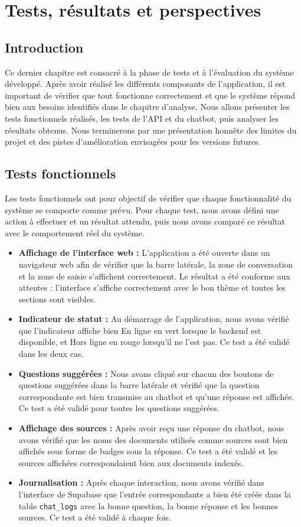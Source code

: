 \documentclass[12pt, a4paper, twoside]{report}
\begin{document}
\chapter{Tests, résultats et perspectives}

\section{Introduction}
Ce dernier chapitre est consacré à la phase de tests et à l'évaluation du système développé. Après avoir réalisé les différents composants de l'application, il est important de vérifier que tout fonctionne correctement et que le système répond bien aux besoins identifiés dans le chapitre d'analyse. Nous allons présenter les tests fonctionnels réalisés, les tests de l'API et du chatbot, puis analyser les résultats obtenus. Nous terminerons par une présentation honnête des limites du projet et des pistes d'amélioration envisagées pour les versions futures.

\section{Tests fonctionnels}
Les tests fonctionnels ont pour objectif de vérifier que chaque fonctionnalité du système se comporte comme prévu. Pour chaque test, nous avons défini une action à effectuer et un résultat attendu, puis nous avons comparé ce résultat avec le comportement réel du système.

\begin{itemize}[label=\bullet]
    \item \textbf{Affichage de l'interface web :} L'application a été ouverte dans un navigateur web afin de vérifier que la barre latérale, la zone de conversation et la zone de saisie s'affichent correctement. Le résultat a été conforme aux attentes : l'interface s'affiche correctement avec le bon thème et toutes les sections sont visibles.
    \item \textbf{Indicateur de statut :} Au démarrage de l'application, nous avons vérifié que l'indicateur affiche bien \og En ligne \fg en vert lorsque le backend est disponible, et \og Hors ligne \fg en rouge lorsqu'il ne l'est pas. Ce test a été validé dans les deux cas.
    \item \textbf{Questions suggérées :} Nous avons cliqué sur chacun des boutons de questions suggérées dans la barre latérale et vérifié que la question correspondante est bien transmise au chatbot et qu'une réponse est affichée. Ce test a été validé pour toutes les questions suggérées.
    \item \textbf{Affichage des sources :} Après avoir reçu une réponse du chatbot, nous avons vérifié que les noms des documents utilisés comme sources sont bien affichés sous forme de badges sous la réponse. Ce test a été validé et les sources affichées correspondaient bien aux documents indexés.
    \item \textbf{Journalisation :} Après chaque interaction, nous avons vérifié dans l'interface de Supabase que l'entrée correspondante a bien été créée dans la table \texttt{chat\_logs} avec la bonne question, la bonne réponse et les bonnes sources. Ce test a été validé à chaque fois.
\end{itemize}
\end{document}
